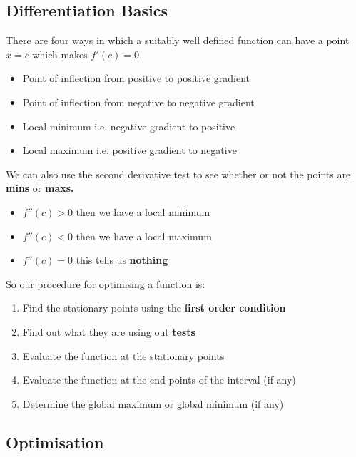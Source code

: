 \documentclass[12pt, letterpaper]{article}
\begin{document}
\subsection{Differentiation Basics}
There are four ways in which a suitably well defined function can have a point $x = c$ which makes $f'(c)=0$
\begin{itemize}
	\item Point of inflection from positive to positive gradient
	\item Point of inflection from negative to negative gradient
	\item Local minimum i.e. negative gradient to positive
	\item Local maximum i.e. positive gradient to negative
	\end{itemize}
We can also use the second derivative test to see whether or not the points are \textbf{mins} or \textbf{maxs.}
\begin{itemize}
	\item $f''(c) > 0$ then we have a local minimum
	\item $f''(c) < 0$ then we have a local maximum
	\item $f''(c) = 0$ this tells us \textbf{nothing}
\end{itemize}
So our procedure for optimising a function is:
\begin{enumerate}
	\item Find the stationary points using the \textbf{first order condition}
	\item Find out what they are using out \textbf{tests} 
	\item Evaluate the function at the stationary points
	\item Evaluate the function at the end-points of the interval (if any)
	\item Determine the global maximum or global minimum (if any)
\end{enumerate}

\subsection{Optimisation}
\end{document}
